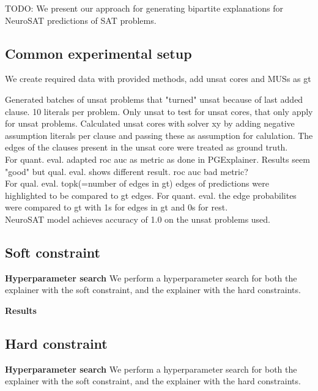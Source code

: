 TODO: We present our approach for generating bipartite explanations for NeuroSAT \cite{} predictions of SAT problems.

\subsection{Common experimental setup}

We create required data with provided methods, add unsat cores and MUSs as gt


Generated batches of unsat problems that "turned" unsat because of last added clause. 10 literals per problem. Only unsat to test for unsat cores, that only apply for unsat problems. Calculated unsat cores with solver xy by adding negative assumption literals per clause and passing these as assumption for calulation. The edges of the clauses present in the unsat core were treated as ground truth. \\


For quant. eval. adapted roc auc as metric as done in PGExplainer. Results seem "good" but qual. eval. shows different result. roc auc bad metric? \\
For qual. eval. topk(=number of edges in gt) edges of predictions were highlighted to be compared to gt edges. For quant. eval. the edge probabilites were compared to gt with 1s for edges in gt and 0s for rest. \\

NeuroSAT model achieves accuracy of 1.0 on the unsat problems used.





\subsection{Soft constraint}

\textbf{Hyperparameter search}
We perform a hyperparameter search for both the explainer with the soft constraint, and the explainer with the hard constraints.

\textbf{Results}


\subsection{Hard constraint}

\textbf{Hyperparameter search}
We perform a hyperparameter search for both the explainer with the soft constraint, and the explainer with the hard constraints.